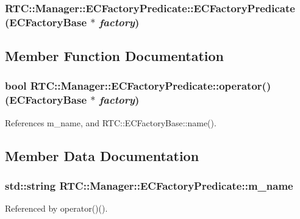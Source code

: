 \subsubsection[{ECFactoryPredicate}]{\setlength{\rightskip}{0pt plus 5cm}RTC::Manager::ECFactoryPredicate::ECFactoryPredicate ({\bf ECFactoryBase} $\ast$ {\em factory})\hspace{0.3cm}{\ttfamily  [inline]}}\label{structRTC_1_1Manager_1_1ECFactoryPredicate_a11d231c5d1145dee8137703c7dd1ad5c}


\subsection{Member Function Documentation}
\subsubsection[{operator()}]{\setlength{\rightskip}{0pt plus 5cm}bool RTC::Manager::ECFactoryPredicate::operator() ({\bf ECFactoryBase} $\ast$ {\em factory})\hspace{0.3cm}{\ttfamily  [inline]}}\label{structRTC_1_1Manager_1_1ECFactoryPredicate_a35e4b2a94d5093eb1c4475d8385d7dbd}


References m\_\-name, and RTC::ECFactoryBase::name().



\subsection{Member Data Documentation}
\subsubsection[{m\_\-name}]{\setlength{\rightskip}{0pt plus 5cm}std::string {\bf RTC::Manager::ECFactoryPredicate::m\_\-name}}\label{structRTC_1_1Manager_1_1ECFactoryPredicate_a3909d7800075eec8117fef8cc864a067}


Referenced by operator()().

